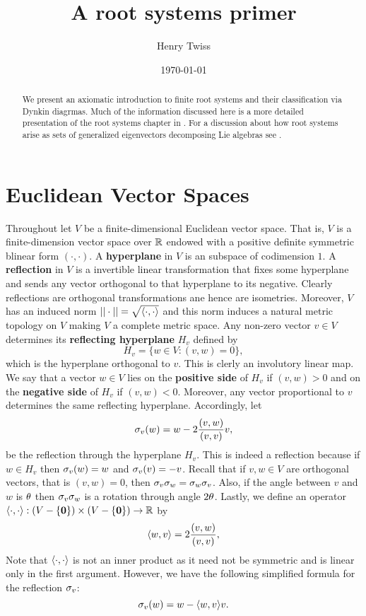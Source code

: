 \documentclass[12pt,reqno,oneside]{amsart}
\title{A root systems primer}
\author{Henry Twiss}
\date{\today}
\begin{document}
\begin{abstract}
    We present an axiomatic introduction to finite root systems and their classification via Dynkin diagrmas. Much of the information discussed here is a more detailed presentation of the root systems chapter in \cite{Hu}. For a discussion about how root systems arise as sets of generalized eigenvectors decomposing Lie algebras see \cite{Hu}.
\end{abstract}

\maketitle

\section{Euclidean Vector Spaces}
    Throughout let $V$ be a finite-dimensional Euclidean vector space. That is, $V$ is a finite-dimension vector space over $\mathbb{R}$ endowed with a positive definite symmetric blinear form $(\cdot,\cdot)$. A \textbf{hyperplane} in $V$ is an subspace of codimension $1$. A \textbf{reflection} in $V$ is a invertible linear transformation that fixes some hyperplane and sends any vector orthogonal to that hyperplane to its negative. Clearly reflections are orthogonal transformations ane hence are isometries. Moreover, $V$ has an induced norm $||\cdot|| = \sqrt{\langle\cdot,\cdot\rangle}$ and this norm induces a natural metric topology on $V$ making $V$ a complete metric space. Any non-zero vector $v \in V$ determines its \textbf{reflecting hyperplane} $H_{v}$ defined by
    \[
        H_{v} = \{w \in V:(v,w) = 0\},
    \]
    which is the hyperplane orthogonal to $v$. This is clerly an involutory linear map. We say that a vector $w \in V$ lies on the \textbf{positive side} of $H_{v}$ if $(v,w) > 0$ and on the \textbf{negative side} of $H_{v}$ if $(v,w) < 0$. Moreover, any vector proportional to $v$ determines the same reflecting hyperplane. Accordingly, let
    \[
        \sigma_{v}(w) = w-2\frac{(v,w)}{(v,v)}v, 
    \]
    be the reflection through the hyperplane $H_{v}$. This is indeed a reflection because if $w \in H_{v}$ then $\sigma_{v}(w) = w$ and $\sigma_{v}(v) = -v$. Recall that if $v,w \in V$ are orthogonal vectors, that is $(v,w) = 0$, then $\sigma_{v}\sigma_{w} = \sigma_{w}\sigma_{v}$. Also, if the angle between $v$ and $w$ is $\theta$ then $\sigma_{v}\sigma_{w}$ is a rotation through angle $2\theta$. Lastly, we define an operator $\langle\cdot,\cdot\rangle:(V-\{\mathbf{0}\}) \times (V-\{\mathbf{0}\}) \to \mathbb{R}$ by
    \[
        \langle w,v\rangle = 2\frac{(v,w)}{(v,v)},
    \]
    Note that $\langle\cdot,\cdot\rangle$ is not an inner product as it need not be symmetric and is linear only in the first argument. However, we have the following simplified formula for the reflection $\sigma_{v}$:
    \[
        \sigma_{v}(w) = w-\langle w,v\rangle v.
    \]
\end{document}
